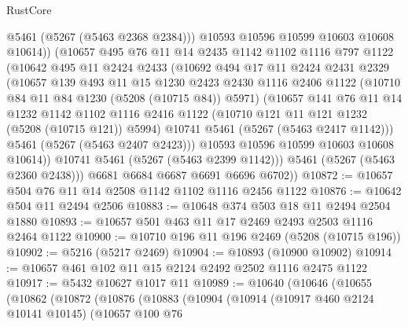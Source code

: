 \begin{lexlean}{RustCore}
\begin{coremodule}
                @5461
                (@5267 (@5463 @2368 @2384)))
              @10593
              @10596
              @10599
              @10603
              @10608
              @10614))
          (@10657
            @495
            @76
            @11
            @14
            @2435
            @1142
            @1102
            @1116
            @797
            @1122
            (@10642
              @495
              @11
              @2424
              @2433
              (@10692
                @494
                @17
                @11
                @2424
                @2431
                @2329
                (@10657
                  @139
                  @493
                  @11
                  @15
                  @1230
                  @2423
                  @2430
                  @1116
                  @2406
                  @1122
                  (@10710 @84 @11 @84 @1230 (@5208 (@10715 @84)) @5971)
                  (@10657
                    @141
                    @76
                    @11
                    @14
                    @1232
                    @1142
                    @1102
                    @1116
                    @2416
                    @1122
                    (@10710 @121 @11 @121 @1232 (@5208 (@10715 @121)) @5994)
                    @10741
                    @5461
                    (@5267 (@5463 @2417 @1142)))
                  @5461
                  (@5267 (@5463 @2407 @2423)))
                @10593
                @10596
                @10599
                @10603
                @10608
                @10614))
            @10741
            @5461
            (@5267 (@5463 @2399 @1142)))
          @5461
          (@5267 (@5463 @2360 @2438)))
        @6681
        @6684
        @6687
        @6691
        @6696
        @6702))
@10872 := @10657 @504 @76 @11 @14 @2508 @1142 @1102 @1116 @2456 @1122
@10876 := @10642 @504 @11 @2494 @2506
@10883 := @10648 @374 @503 @18 @11 @2494 @2504 @1880
@10893 := @10657 @501 @463 @11 @17 @2469 @2493 @2503 @1116 @2464 @1122
@10900 := @10710 @196 @11 @196 @2469 (@5208 (@10715 @196))
@10902 := @5216 (@5217 @2469)
@10904 := @10893 (@10900 @10902)
@10914 := @10657 @461 @102 @11 @15 @2124 @2492 @2502 @1116 @2475 @1122
@10917 := @5432 @10627 @1017 @11
@10989 := @10640
    (@10646
      (@10655
        (@10862
          (@10872
            (@10876
              (@10883
                (@10904
                  (@10914
                    (@10917 @460 @2124 @10141 @10145)
                    (@10657
                      @100
                      @76

\end{coremodule}
\end{lexlean}
